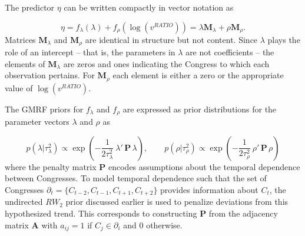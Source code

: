 The predictor $\eta$ can be written compactly in vector notation as 

{\singlespacing
$$ \eta = f_\lambda(\lambda) +  f_\rho(\log{(v^{RATIO})}) = \lambda \mathbf{M}_\lambda + \rho \mathbf{M}_\rho.$$
}
%
Matrices $\mathbf{M}_\lambda$ and $\mathbf{M}_\rho$ are identical in structure but not content. Since $\lambda$ plays the role of an intercept -- that is, the parameters in $\lambda$ are not coefficients -- the elements of $\mathbf{M}_\lambda$ are zeros and ones indicating the Congress to which each observation pertains. For $\mathbf{M}_\rho$ each element is either a zero or the appropriate value of $\log{(v^{RATIO})}$. 


The GMRF priors for $f_{\lambda}$ and $f_{\rho}$ are expressed as prior distributions for the parameter vectors $\lambda$ and $\rho$ as 

{\singlespacing
$$ 
p(\lambda | \tau_\lambda^2) \propto \exp{\left(-\frac{1}{2\tau_\lambda^2} \: \lambda' \, \mathbf{P}  \, \lambda \right)}, 
\qquad
p(\rho | \tau_\rho^2) \propto \exp{\left(-\frac{1}{2\tau_\rho^2} \: \rho' \, \mathbf{P} \, \rho \right)}
 $$
}
%
\noindent where the penalty matrix $\mathbf{P}$ encodes assumptions about the temporal dependence between Congresses. %
To model temporal dependence such that the set of Congresses $\partial_t = \{C_{t-2}, C_{t-1}, C_{t+1}, C_{t + 2} \}$ provides information about $C_t$, the undirected $RW_2$ prior discussed earlier is used to penalize deviations from this hypothesized trend. This corresponds to constructing $\mathbf{P}$ from the adjacency matrix $\mathbf{A}$ with $a_{ij} = 1$ if $C_j \in \partial_i$ and 0 otherwise.


